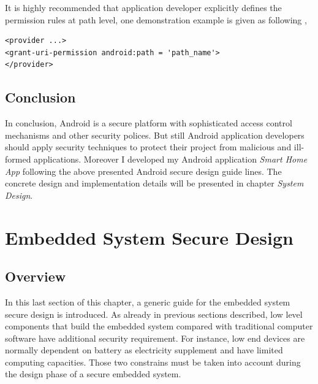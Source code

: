 It is highly recommended that application developer explicitly defines the permission rules at path level, one demonstration example is given as following \cite{android_secure_cook}, 
\begin{Verbatim}[fontsize=\relsize{-1},frame=lines,framesep=4mm, label=\fbox{\small\emph{Content Path Securing}}]
<provider ...>
<grant-uri-permission android:path = 'path_name'>
</provider>
\end{Verbatim} 
\subsection{Conclusion}
In conclusion, Android is  a secure platform with sophisticated access control mechanisms and other security polices. But still Android application developers should apply security techniques to protect their project from malicious and ill-formed applications. Moreover I developed my Android application \emph{Smart Home App} following the above presented Android secure design guide lines. The concrete design and implementation details will be presented in chapter \emph{System Design}. 

\section{Embedded System Secure Design} \label{secESSD}
\subsection{Overview}
In this last section of this chapter, a generic guide for the embedded system secure design is introduced. As already in previous sections described, low level components that build the embedded system compared with traditional  computer software have additional security requirement. For instance, low end devices are normally dependent on battery as electricity supplement and have limited computing capacities. Those two constrains must be taken into account during the design phase of a secure embedded system.
